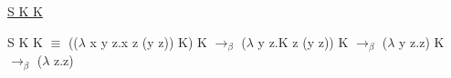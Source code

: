 \documentclass{article}
\begin{document}
\begin{center}
    \underline{S K K}
\end{center}
\begin{center}
    S K K $\equiv$ (($\lambda$ x y z.x z (y z)) K) K $\to_\beta$ ($\lambda$ y z.K z (y z)) K $\to_\beta$
    ($\lambda$ y z.z) K $\to_\beta$ ($\lambda$ z.z) 
\end{center}
\end{document}

